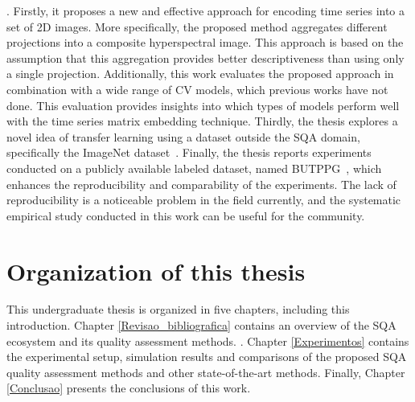 . Firstly, it proposes a new and effective approach for encoding time series into a set of 2D images. More specifically, the proposed method aggregates different projections into a composite hyperspectral image. This approach is based on the assumption that this aggregation provides better descriptiveness than using only a single projection. Additionally, this work evaluates the proposed approach in combination with a wide range of \gls{CV} models, which previous works have not done. This evaluation provides insights into which types of models perform well with the time series matrix embedding technique. Thirdly, the thesis explores a novel idea of transfer learning using a dataset outside the \gls{SQA} domain, specifically the ImageNet dataset~\cite{ImageNet}. Finally, the thesis reports experiments conducted on a publicly available labeled dataset, named \gls{BUTPPG}~\cite{butppg}, which enhances the reproducibility and comparability of the experiments. The lack of reproducibility is a noticeable problem in the field currently, and the systematic empirical study conducted in this work can be useful for the community.

\section{Organization of this thesis}
\label{sec:organization}

This undergraduate thesis is organized in five chapters, including this introduction. Chapter \ref{Revisao_bibliografica} contains an overview of the \gls{SQA} ecosystem and its quality assessment methods. . Chapter \ref{Experimentos} contains the experimental setup, simulation results and comparisons of the proposed \gls{SQA} quality assessment methods and other state-of-the-art methods. Finally, Chapter \ref{Conclusao} presents the conclusions of this work. 


